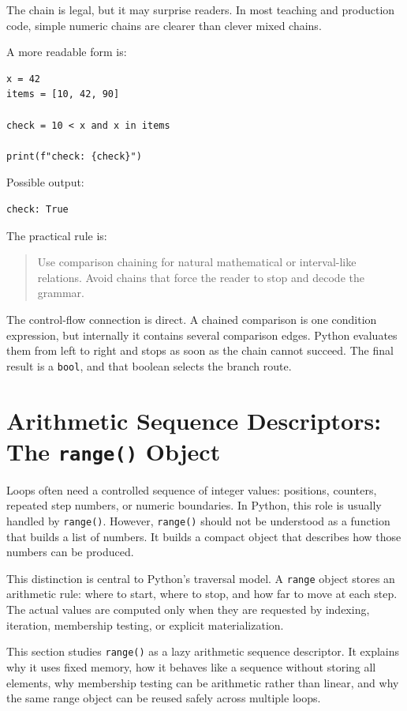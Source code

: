 \documentclass[a4paper,twoside]{report}
\begin{document}
The chain is legal, but it may surprise readers. In most teaching and production code, simple numeric chains are clearer than clever mixed chains.

A more readable form is:

\begin{verbatim}
x = 42
items = [10, 42, 90]

check = 10 < x and x in items

print(f"check: {check}")
\end{verbatim}

Possible output:

\begin{verbatim}
check: True
\end{verbatim}

The practical rule is:

\begin{quote}
Use comparison chaining for natural mathematical or interval-like relations. Avoid chains that force the reader to stop and decode the grammar.
\end{quote}

The control-flow connection is direct. A chained comparison is one condition expression, but internally it contains several comparison edges. Python evaluates them from left to right and stops as soon as the chain cannot succeed. The final result is a \texttt{bool}, and that boolean selects the branch route.

\section{Arithmetic Sequence Descriptors: The \texttt{range()} Object}

Loops often need a controlled sequence of integer values: positions, counters, repeated step numbers, or numeric boundaries. In Python, this role is usually handled by \texttt{range()}. However, \texttt{range()} should not be understood as a function that builds a list of numbers. It builds a compact object that describes how those numbers can be produced.

This distinction is central to Python's traversal model. A \texttt{range} object stores an arithmetic rule: where to start, where to stop, and how far to move at each step. The actual values are computed only when they are requested by indexing, iteration, membership testing, or explicit materialization.

This section studies \texttt{range()} as a lazy arithmetic sequence descriptor. It explains why it uses fixed memory, how it behaves like a sequence without storing all elements, why membership testing can be arithmetic rather than linear, and why the same range object can be reused safely across multiple loops.
\end{document}
